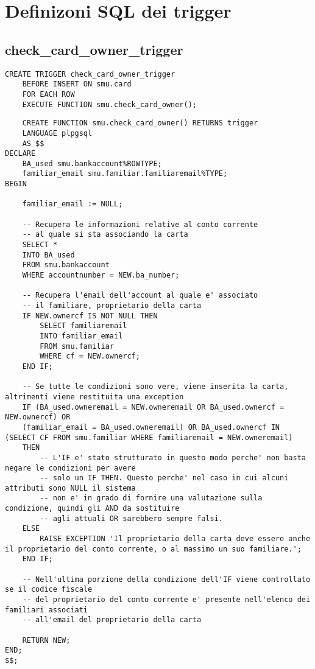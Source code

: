 \section{Definizoni SQL dei trigger}

\subsection{check\_card\_owner\_trigger}

\begin{lstlisting}
CREATE TRIGGER check_card_owner_trigger
    BEFORE INSERT ON smu.card
    FOR EACH ROW
    EXECUTE FUNCTION smu.check_card_owner();
\end{lstlisting}

\begin{lstlisting}
    CREATE FUNCTION smu.check_card_owner() RETURNS trigger
    LANGUAGE plpgsql
    AS $$
DECLARE
    BA_used smu.bankaccount%ROWTYPE;
    familiar_email smu.familiar.familiaremail%TYPE;
BEGIN

    familiar_email := NULL;

    -- Recupera le informazioni relative al conto corrente
    -- al quale si sta associando la carta
    SELECT *
    INTO BA_used
    FROM smu.bankaccount
    WHERE accountnumber = NEW.ba_number;

    -- Recupera l'email dell'account al quale e' associato
    -- il familiare, proprietario della carta
    IF NEW.ownercf IS NOT NULL THEN
        SELECT familiaremail
        INTO familiar_email
        FROM smu.familiar
        WHERE cf = NEW.ownercf;
    END IF;

    -- Se tutte le condizioni sono vere, viene inserita la carta, altrimenti viene restituita una exception
    IF (BA_used.owneremail = NEW.owneremail OR BA_used.ownercf = NEW.ownercf) OR
    (familiar_email = BA_used.owneremail) OR BA_used.ownercf IN (SELECT CF FROM smu.familiar WHERE familiaremail = NEW.owneremail)
    THEN
        -- L'IF e' stato strutturato in questo modo perche' non basta negare le condizioni per avere
        -- solo un IF THEN. Questo perche' nel caso in cui alcuni attributi sono NULL il sistema
        -- non e' in grado di fornire una valutazione sulla condizione, quindi gli AND da sostituire
        -- agli attuali OR sarebbero sempre falsi.
    ELSE
        RAISE EXCEPTION 'Il proprietario della carta deve essere anche il proprietario del conto corrente, o al massimo un suo familiare.';
    END IF;

    -- Nell'ultima porzione della condizione dell'IF viene controllato se il codice fiscale
    -- del proprietario del conto corrente e' presente nell'elenco dei familiari associati
    -- all'email del proprietario della carta

    RETURN NEW;
END;
$$;
\end{lstlisting}


